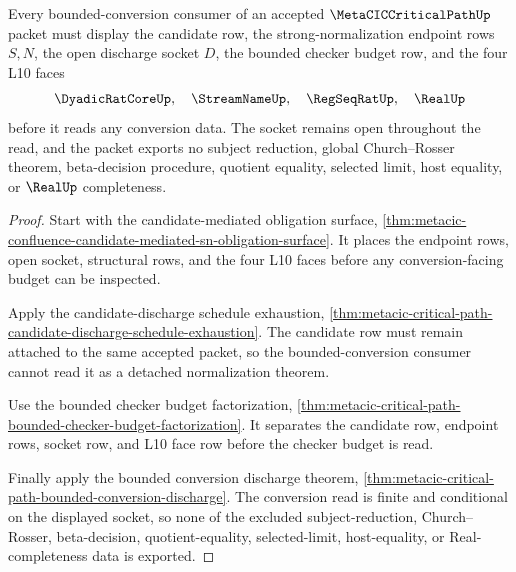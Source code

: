 \begin{theorem}
\label{thm:metacic-critical-path-bounded-conversion-socket-budget}
Every bounded-conversion consumer of an accepted $\MetaCICCriticalPathUp$ packet must display the candidate row, the strong-normalization endpoint rows $S,N$, the open discharge socket $D$, the bounded checker budget row, and the four L10 faces
$$
\DyadicRatCoreUp,\quad \StreamNameUp,\quad \RegSeqRatUp,\quad \RealUp
$$
before it reads any conversion data. The socket remains open throughout the read, and the packet exports no subject reduction, global Church--Rosser theorem, beta-decision procedure, quotient equality, selected limit, host equality, or $\RealUp$ completeness.
\end{theorem}
\begin{proof}
Start with the candidate-mediated obligation surface, \autoref{thm:metacic-confluence-candidate-mediated-sn-obligation-surface}. It places the endpoint rows, open socket, structural rows, and the four L10 faces before any conversion-facing budget can be inspected.

Apply the candidate-discharge schedule exhaustion, \autoref{thm:metacic-critical-path-candidate-discharge-schedule-exhaustion}. The candidate row must remain attached to the same accepted packet, so the bounded-conversion consumer cannot read it as a detached normalization theorem.

Use the bounded checker budget factorization, \autoref{thm:metacic-critical-path-bounded-checker-budget-factorization}. It separates the candidate row, endpoint rows, socket row, and L10 face row before the checker budget is read.

Finally apply the bounded conversion discharge theorem, \autoref{thm:metacic-critical-path-bounded-conversion-discharge}. The conversion read is finite and conditional on the displayed socket, so none of the excluded subject-reduction, Church--Rosser, beta-decision, quotient-equality, selected-limit, host-equality, or Real-completeness data is exported.
\end{proof}

